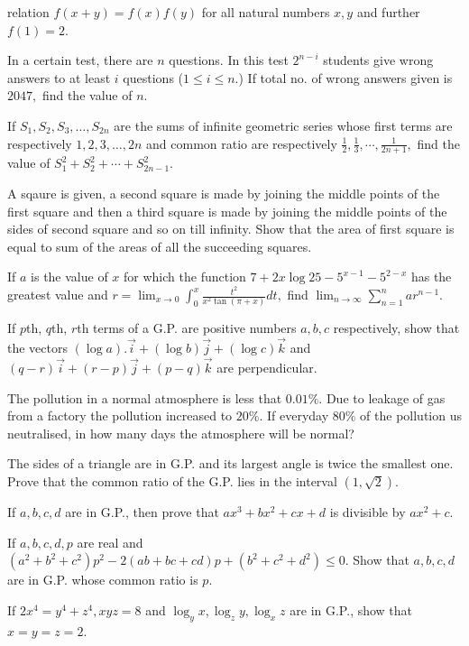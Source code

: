   relation $f(x + y) = f(x)f(y)$ for all natural numbers $x, y$ and further $f(1) = 2$.
\item In a certain test, there are $n$ questions. In this test $2^{n - i}$ students give wrong answers to at least $i$
  questions ($1\leq i \leq n.$) If total no. of wrong answers given is $2047,$ find the value of $n$.
\item If $S_1, S_2, S_3, \ldots, S_{2n}$ are the sums of infinite geometric series whose first terms are respectively $1, 2,
  3, \ldots, 2n$ and common ratio are respectively $\frac{1}{2}, \frac{1}{3}, \cdots, \frac{1}{2n + 1},$ find the value of $S_1^2 +
  S_2^2 + \cdots + S_{2n - 1}^2$.
\item A sqaure is given, a second square is made by joining the middle points of the first square and then a third square
  is made by joining the middle points of the sides of second square and so on till infinity. Show that the area of first square is
  equal to sum of the areas of all the succeeding squares.
\item If $a$ is the value of $x$ for which the function $7 + 2x\log 25 - 5^{x - 1} - 5^{2 - x}$ has the greatest value and
  $r = \displaystyle\lim_{x\to 0}\int_{0}^x\frac{t^2}{x^2\tan(\pi + x)}dt,$ find $\displaystyle\lim_{n \to \infty}\sum_{n =
  1}^nar^{n - 1}$.
\item If $p$th, $q$th, $r$th terms of a G.P. are positive numbers $a, b, c$ respectively, show that the vectors $(\log
  a).\vec{i} + (\log b)\vec{j} + (\log c)\vec{k}$ and $(q - r)\vec{i} + (r - p)\vec{j} + (p - q)\vec{k}$ are perpendicular.
\item The pollution in a normal atmosphere is less that $0.01\%.$ Due to leakage of gas from a factory the pollution
  increased to $20\%.$ If everyday $80\%$ of the pollution us neutralised, in how many days the atmosphere will be normal?
\item The sides of a triangle are in G.P. and its largest angle is twice the smallest one. Prove that the common ratio of
  the G.P. lies in the interval $(1, \sqrt{2})$.
\item If $a, b, c, d$ are in G.P., then prove that $ax^3 + bx^2 + cx + d$ is divisible by $ax^2 + c$.
\item If $a, b, c, d, p$ are real and $(a^2 + b^2 + c^2)p^2 - 2(ab + bc + cd)p + (b^2 + c^2 + d^2)\leq 0$. Show that $a,
  b, c, d$ are in G.P. whose common ratio is $p$.
\item If $2x^4 = y^4 + z^4, xyz = 8$ and $\log_yx, \log_zy, \log_xz$ are in G.P., show that $x = y = z = 2$.
